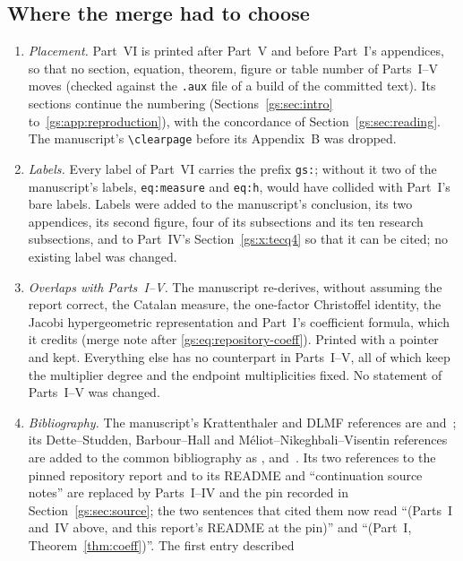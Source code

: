\documentclass[11pt,a4paper]{article}
\numberwithin{equation}{section}
\theoremstyle{definition}
\theoremstyle{remark}
\begin{document}
\subsection{Where the merge had to choose}\label{gs:sec:merge}
\begin{enumerate}[leftmargin=*,itemsep=2pt]
\item \emph{Placement.}  Part~VI is printed after Part~V and before Part~I's
 appendices, so that no section, equation, theorem, figure or table number
 of Parts~I--V moves (checked against the \texttt{.aux} file of a build of
 the committed text).  Its sections continue the numbering
 (Sections~\ref{gs:sec:intro} to~\ref{gs:app:reproduction}), with the
 concordance of Section~\ref{gs:sec:reading}.  The manuscript's
 \verb|\clearpage| before its Appendix~B was dropped.
\item \emph{Labels.}  Every label of Part~VI carries the prefix
 \texttt{gs:}; without it two of the manuscript's labels,
 \texttt{eq:measure} and \texttt{eq:h}, would have collided with Part~I's
 bare labels.  Labels were added to the manuscript's conclusion, its two
 appendices, its second figure, four of its subsections and its ten
 research subsections, and to Part~IV's Section~\ref{gs:x:tecq4} so that it
 can be cited; no existing label was changed.
\item \emph{Overlaps with Parts~I--V.}  The manuscript re-derives, without
 assuming the report correct, the Catalan measure, the one-factor
 Christoffel identity, the Jacobi hypergeometric representation and Part~I's
 coefficient formula, which it credits (merge note after
 \eqref{gs:eq:repository-coeff}).  Printed with a pointer and kept.
 Everything else has no counterpart in Parts~I--V, all of which keep the
 multiplier degree and the endpoint multiplicities fixed.  No statement of
 Parts~I--V was changed.
\item \emph{Bibliography.}  The manuscript's Krattenthaler and DLMF
 references are \cite{Krattenthaler2023} and~\cite{DLMF}; its
 Dette--Studden, Barbour--Hall and M\'eliot--Nikeghbali--Visentin references
 are added to the common bibliography as \cite{DetteStudden1994},
 \cite{BarbourHall1984} and~\cite{MeliotNikeghbaliVisentin2022}.  Its two
 references to the pinned repository report and to its README and
 ``continuation source notes'' are replaced by Parts~I--IV and the pin
 recorded in Section~\ref{gs:sec:source}; the two sentences that cited them
 now read ``(Parts~I and~IV above, and this report's README at the pin)''
 and ``(Part~I, Theorem~\ref{thm:coeff})''.  The first entry described

\end{enumerate}
\end{document}
